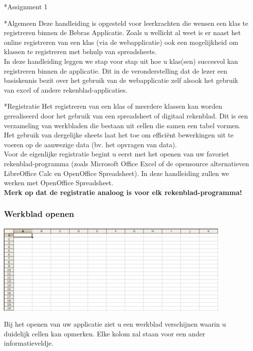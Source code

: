 \begin{section}*{Assignment 1}
 
\begin{subsection}*{Algemeen}
Deze handleiding is opgesteld voor leerkrachten die wensen een klas te registreren binnen de Bebras Applicatie. Zoals u wellicht al weet is er naast het online registreren van een klas (via de webapplicatie) ook een mogelijkheid om klassen te registreren met behulp van spreadsheets. \\
In deze handleiding leggen we stap voor stap uit hoe u klas(sen) succesvol kan registreren binnen de applicatie. Dit in de veronderstelling dat de lezer een basiskennis bezit over het gebruik van de webapplicatie zelf alsook het gebruik van excel of andere rekenblad-applicaties.
\end{subsection}

\begin{subsection}*{Registratie}
Het registreren van een klas of meerdere klassen kan worden gerealiseerd door het gebruik van een spreadsheet of digitaal rekenblad. Dit is een verzameling van werkbladen die bestaan uit cellen die samen een tabel vormen. Het gebruik van dergelijke sheets laat het toe om effici\"ent bewerkingen uit te voeren op de aanwezige data (bv. het opvragen van data).\\
Voor de eigenlijke registratie begint u eerst met het openen van uw favoriet rekenblad-programma (zoals Microsoft Office Excel of de opensource alternatieven LibreOffice Calc en OpenOffice Spreadsheet). In deze handleiding zullen we werken met OpenOffice Spreadsheet.\\
\textbf{Merk op dat de registratie analoog is voor elk rekenblad-programma!}\\
\subsubsection*{Werkblad openen}
\begin{center}
\includegraphics[height=4.5cm]{img/werkblad.png}
\end{center}
Bij het openen van uw applicatie ziet u een werkblad verschijnen waarin u duidelijk cellen kan opmerken. Elke kolom zal staan voor een ander informatieveldje. 


\end{subsection}
\end{section}
